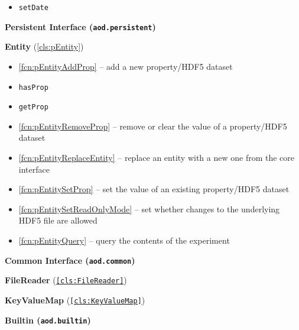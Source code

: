 \documentclass{aodatadocs}
\newcommand{\mclass}[1]{\textcolor{blue}{\texttt{#1}}}
\newcommand{\ret}[1]{\textcolor{purple5}{\texttt{#1}}}
\begin{document}
{\begin{legal}[font=\Large\bfseries, itemsep=1.5ex]
\begin{legal}[font=\large\bfseries, itemsep=1ex]
\begin{itemize}
                \item \ret{setDate}
            \end{itemize}
    \end{legal}
    \item {\Large\bfseries Persistent Interface (\texttt{aod.persistent})}
    \begin{legal}[font=\large\bfseries, itemsep=1ex]
        \item {\large\textbf{Entity} (\ref{cls:pEntity})}
        \begin{itemize}
            \item \ref{fcn:pEntityAddProp} -- add a new property/HDF5 dataset
            \item \ret{hasProp}
            \item \ret{getProp}
            \item \ref{fcn:pEntityRemoveProp} -- remove or clear the value of a property/HDF5 dataset 
            \item \ref{fcn:pEntityReplaceEntity} -- replace an entity with a new one from the core interface
            \item \ref{fcn:pEntitySetProp} -- set the value of an existing property/HDF5 dataset 
            \item \ref{fcn:pEntitySetReadOnlyMode} -- set whether changes to the underlying HDF5 file are allowed
            \item \ref{fcn:pEntityQuery} -- query the contents of the experiment
        \end{itemize}
    \end{legal}
    \item {\Large\bfseries Common Interface (\texttt{aod.common})}
    \begin{legal}[font=\large\bfseries, itemsep=1ex]
        \item {\large\textbf{FileReader} (\texttt{\ref{cls:FileReader}})}
        \item {\large\textbf{KeyValueMap} (\texttt{\ref{cls:KeyValueMap}})}
    \end{legal}
    \item {\Large\bfseries Builtin (\texttt{aod.builtin})}

\end{legal}}
\end{document}
